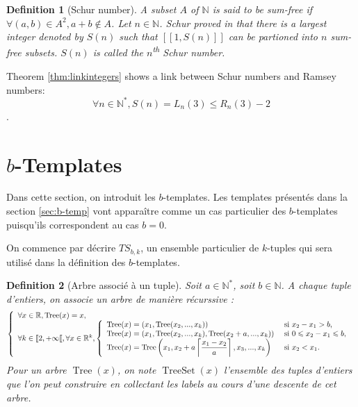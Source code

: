 \documentclass{article}
\newtheorem{definition}{Definition}[section]
\DeclareMathOperator{\tree}{Tree}
\DeclareMathOperator{\treeset}{TreeSet}
\newcommand{\TS}{\mathit{TS}}
\begin{document}
\begin{definition}[Schur number]
A subset \(A\) of \(\mathbb{N}\) is said to be sum-free if \(\forall (a, b) \in A^2, a + b \notin A\). Let 
\(n \in \mathbb{N}\). Schur proved in \cite{Schur1917} that there is a largest integer denoted by \(S(n)\) such that 
\([\![1, S(n)]\!]\) can be partioned into \(n\) sum-free subsets. \(S(n)\) is called the \(n\)\textsuperscript{th} 
Schur number.
\end{definition}

Theorem \ref{thm:linkintegers} shows a link between Schur numbers and Ramsey numbers:
\[\forall n \in \mathbb{N}^*, S(n) = L_n(3) \leqslant R_n(3) - 2\].

\section{\(b\)-Templates}
\label{sec:temp}
Dans cette section, on introduit les \(b\)-templates. Les templates présentés dans la section \ref{sec:b-temp} vont apparaître comme un cas particulier des \(b\)-templates puisqu'ils correspondent au cas \(b = 0\).

On commence par décrire \(\TS_{b,k}\), un ensemble particulier de \(k\)-tuples qui sera utilisé dans la définition des \(b\)-templates.

\begin{definition}[Arbre associé à un tuple]
Soit \(a \in \mathbb{N}^*\), soit \(b \in \mathbb{N}\). A chaque tuple d'entiers, on associe un arbre de manière récurssive :
\[ \left\{
\begin{array}{l}
	\forall x \in \mathbb{R}, \tree(x) = x, \\
	\forall k \in [\![2, +\infty[\![, \forall x \in \mathbb{R}^k,
		\left\{
		\begin{array}{l l}
			\tree(x) = (x_1, \tree(x_2, ..., x_k)) &  ~\text{si}~ x_2 - x_1 > b, \\
			\tree(x) = (x_1, \tree(x_2, ..., x_k), \tree(x_2 + a, ..., x_k)) &  ~\text{si}~ 0 \leqslant x_2 - x_1 \leqslant b, \\
			\tree(x) = \tree\left(x_1, x_2 + a \left\lceil \dfrac{x_1 - x_2}{a}\right\rceil, x_3, ..., x_k\right) & ~\text{si}~ x_2 < x_1.
		\end{array}
		\right.
\end{array}
\right. \]
Pour un arbre \(\tree(x)\), on note \(\treeset(x)\) l'ensemble des tuples d'entiers que l'on peut construire en collectant les labels au cours d'une descente de cet arbre.
\end{definition}
\end{document}
